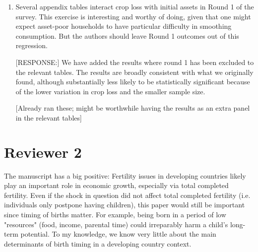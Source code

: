 \documentclass[letterpaper,12pt]{article}
\begin{document}
\begin{enumerate}
\item Several appendix tables interact crop loss with initial assets in
Round 1 of the survey. This exercise is interesting and worthy of doing,
given that one might expect asset-poor households to have particular
difficulty in smoothing consumption. But the authors should leave Round
1 outcomes out of this regression.

[RESPONSE:] We have added the results where round 1 has been excluded
to the relevant tables.
The results are broadly consistent with what we originally found, 
although substantially less likely to be statistically significant 
because of the lower variation in crop loss and the smaller sample
size.

[Already ran these; might be worthwhile having the results as an extra
panel in the relevant tables]


\end{enumerate}



\newpage

\section*{Reviewer 2}


The manuscript has a big positive: Fertility issues in developing
countries likely play an important role in economic growth, especially
via total completed fertility. Even if the shock in question did not
affect total completed fertility (i.e. individuals only postpone having
children), this paper would still be important since timing of births
matter. For example, being born in a period of low "resources" (food,
income, parental time) could irreparably harm a child's long-term
potential. To my knowledge, we know very little about the main
determinants of birth timing in a developing country context.
\end{document}
